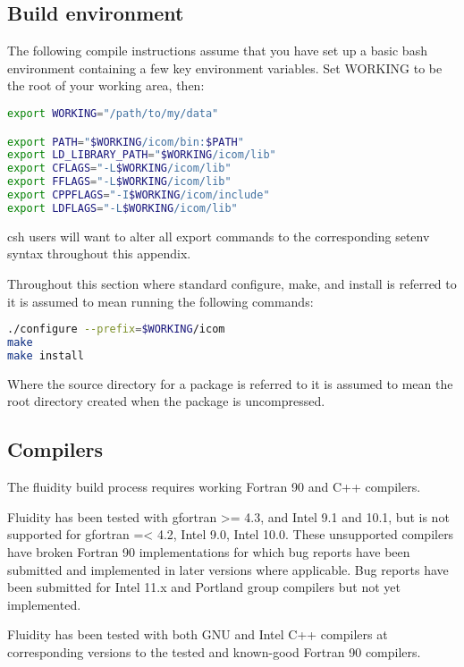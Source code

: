 \subsection{Build environment}
\label{sect:required_libraries_build_environment}

The following compile instructions assume that you have set up a basic
bash environment containing a few key environment variables. Set WORKING to be the
root of your working area, then:

\begin{lstlisting}[language=bash]
export WORKING="/path/to/my/data"

export PATH="$WORKING/icom/bin:$PATH"
export LD_LIBRARY_PATH="$WORKING/icom/lib"
export CFLAGS="-L$WORKING/icom/lib"
export FFLAGS="-L$WORKING/icom/lib"
export CPPFLAGS="-I$WORKING/icom/include"
export LDFLAGS="-L$WORKING/icom/lib"
\end{lstlisting}

csh users will want to alter all export commands to the corresponding setenv
syntax throughout this appendix.

Throughout this section where standard configure, make, and install is referred
to it is assumed to mean running the following commands:

\begin{lstlisting}[language=bash]
./configure --prefix=$WORKING/icom
make
make install
\end{lstlisting}

Where the source directory for a package is referred to it is assumed to mean
the root directory created when the package is uncompressed.

\subsection{Compilers}
\label{sect:required_libraries_compilers}

The fluidity build process requires working Fortran 90 and C++ compilers.

Fluidity has been tested with gfortran >= 4.3, and Intel 9.1 and 10.1, but is
not supported for gfortran =< 4.2, Intel 9.0, Intel 10.0. These unsupported
compilers have broken Fortran 90 implementations for which bug reports have
been submitted and implemented in later versions where applicable. Bug reports
have been submitted for Intel 11.x and Portland group compilers but not yet
implemented.

Fluidity has been tested with both GNU and Intel C++ compilers at corresponding
versions to the tested and known-good Fortran 90 compilers.

